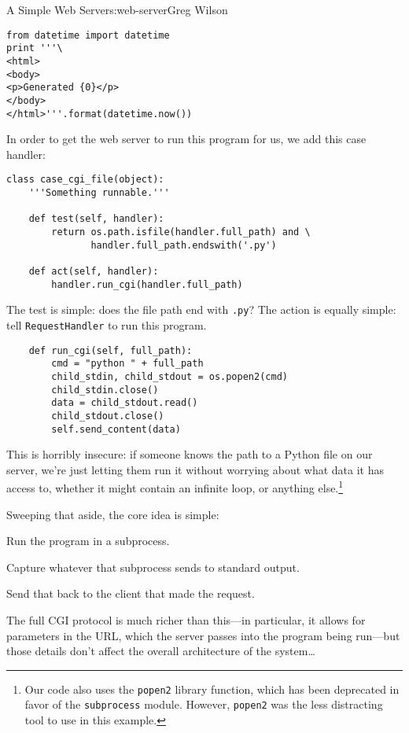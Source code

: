 \begin{aosachapter}{A Simple Web Server}{s:web-server}{Greg Wilson}
\begin{verbatim}
from datetime import datetime
print '''\
<html>
<body>
<p>Generated {0}</p>
</body>
</html>'''.format(datetime.now())
\end{verbatim}

In order to get the web server to run this program for us, we add this
case handler:

\begin{verbatim}
class case_cgi_file(object):
    '''Something runnable.'''

    def test(self, handler):
        return os.path.isfile(handler.full_path) and \
               handler.full_path.endswith('.py')

    def act(self, handler):
        handler.run_cgi(handler.full_path)
\end{verbatim}

The test is simple: does the file path end with \texttt{.py}? The action
is equally simple: tell \texttt{RequestHandler} to run this program.

\begin{verbatim}
    def run_cgi(self, full_path):
        cmd = "python " + full_path
        child_stdin, child_stdout = os.popen2(cmd)
        child_stdin.close()
        data = child_stdout.read()
        child_stdout.close()
        self.send_content(data)
\end{verbatim}

This is horribly insecure: if someone knows the path to a Python file on
our server, we're just letting them run it without worrying about what
data it has access to, whether it might contain an infinite loop, or
anything else.\footnote{Our code also uses the \texttt{popen2} library
  function, which has been deprecated in favor of the
  \texttt{subprocess} module. However, \texttt{popen2} was the less
  distracting tool to use in this example.}

Sweeping that aside, the core idea is simple:

\begin{aosaenumerate}
\def\labelenumi{\arabic{enumi}.}

\item
  Run the program in a subprocess.
\item
  Capture whatever that subprocess sends to standard output.
\item
  Send that back to the client that made the request.
\end{aosaenumerate}

The full CGI protocol is much richer than this---in particular, it
allows for parameters in the URL, which the server passes into the
program being run---but those details don't affect the overall
architecture of the system\ldots{}


\end{aosachapter}
